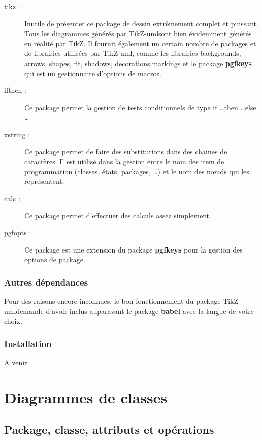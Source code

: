 \documentclass[a4paper,11pt]{report}
\newcommand{\tuml}{{\sc TikZ-uml}}
\newcommand{\TikZ}{{\sc TikZ}}
\begin{document}
\begin{description}
\item[tikz :] Inutile de présenter ce package de dessin extrêmement complet et puissant. Tous les diagrammes générés par \tuml sont bien évidemment générés en réalité par \TikZ. Il fournit également un certain nombre de packages et de librairies utilisées par \tuml, comme les librairies backgrounds, arrows, shapes, fit, shadows, decorations.markings et le package {\bf pgfkeys} qui est un gestionnaire d'options de macros.
\item[ifthen :] Ce package permet la gestion de tests conditionnels de type if \ldots then \ldots else \ldots
\item[xstring :] Ce package permet de faire des substitutions dans des chaines de caractères. Il est utilisé dans la gestion entre le nom des item de programmation (classes, états, packages, \ldots) et le nom des n\oe{}uds qui les représentent.
\item[calc :] Ce package permet d'effectuer des calculs assez simplement.
\item[pgfopts :] Ce package est une extension du package {\bf pgfkeys} pour la gestion des options de package.
\end{description}

\subsection*{Autres dépendances}

Pour des raisons encore inconnues, le bon fonctionnement du package \tuml demande d'avoir inclus auparavant le package {\bf babel} avec la langue de votre choix.

\subsection*{Installation}

A venir

\chapter{Diagrammes de classes}\label{c.class}

\section{Package, classe, attributs et opérations}\label{s.packageclass}
\end{document}
